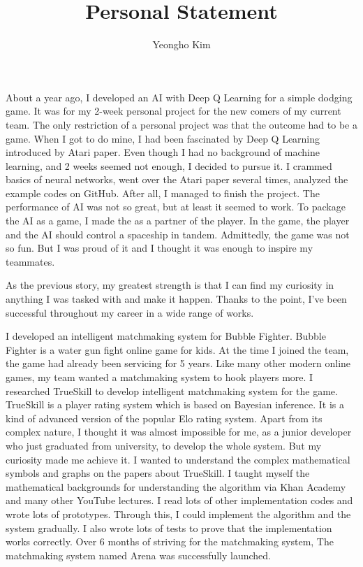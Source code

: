 \documentclass[11pt]{article}
\author{Yeongho Kim}
\date{}
\title{Personal Statement}
\begin{document}
\maketitle
\vspace{-6ex}

About a year ago, I developed an AI with Deep Q Learning for a simple dodging game.
It was for my 2-week personal project for the new comers of my current team.
The only restriction of a personal project was that the outcome had to be a game.
When I got to do mine, I had been fascinated by Deep Q Learning introduced by Atari paper.
Even though I had no background of machine learning, and 2 weeks seemed not enough, I decided to pursue it.
I crammed basics of neural networks, went over the Atari paper several times, analyzed the example codes on GitHub.
After all, I managed to finish the project.
The performance of AI was not so great, but at least it seemed to work.
To package the AI as a game, I made the as a partner of the player.
In the game, the player and the AI should control a spaceship in tandem.
Admittedly, the game was not so fun. But I was proud of it and I thought it was enough to inspire my teammates. 

As the previous story, my greatest strength is that
I can find my curiosity in anything I was tasked with and make it happen.
Thanks to the point, I've been successful throughout my career in a wide range of works. 

I developed an intelligent matchmaking system for Bubble Fighter.
Bubble Fighter is a water gun fight online game for kids.
At the time I joined the team, the game had already been servicing for 5 years.
Like many other modern online games, my team wanted a matchmaking system to hook players more.
I researched TrueSkill to develop intelligent matchmaking system for the game.
TrueSkill is a player rating system which is based on Bayesian inference.
It is a kind of advanced version of the popular Elo rating system.
Apart from its complex nature, I thought it was almost impossible for me, as a junior developer who just graduated from university, to develop the whole system.
But my curiosity made me achieve it.
I wanted to understand the complex mathematical symbols and graphs on the papers about TrueSkill.
I taught myself the mathematical backgrounds for understanding the algorithm via Khan Academy and many other YouTube lectures.
I read lots of other implementation codes and wrote lots of prototypes.
Through this, I could implement the algorithm and the system gradually.
I also wrote lots of tests to prove that the implementation works correctly.
Over 6 months of striving for the matchmaking system, The matchmaking system named Arena was successfully launched.
\end{document}
